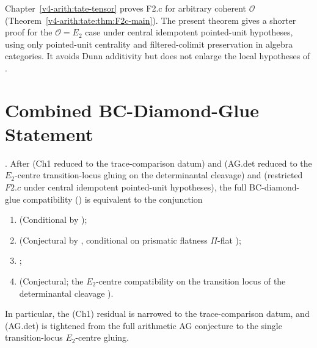 \begin{remark}
\label{v4-arith:w5-h:rem:f2c-value-add}
Chapter~\ref{v4-arith:tate-tensor} proves F2.c for
arbitrary coherent \(\mathcal{O}\) (Theorem~\ref{v4-arith:tate:thm:F2c-main}).
The present theorem gives a shorter proof for the
\(\mathcal{O}=E_{2}\) case under central idempotent pointed-unit
hypotheses, using only pointed-unit centrality and filtered-colimit
preservation in algebra categories. It avoids Dunn additivity but does
not enlarge the local hypotheses of
.
\end{remark}

\section{Combined BC-Diamond-Glue Statement}
\label{v4-arith:w5-h:combined}

\begin{theorem}
\label{v4-arith:w5-h:thm:combined-bcglue}
\ClaimStatusNeedsVerification. After
 (Ch1 reduced to the trace-comparison datum) and
 (AG.det reduced to the
\(E_{2}\)-centre transition-locus gluing on the determinantal cleavage)
and  (restricted \(F2.c\)
under central idempotent pointed-unit hypotheses), the full
BC-diamond-glue compatibility
() is equivalent to
the conjunction
\begin{enumerate}
\item[\textbf{(BCglue.local)}] (Conditional by
);
\item[\textbf{(BCglue.glue)}] (Conjectural by
, conditional on
prismatic flatness \(\Pi\)-flat
);
\item[\textbf{(Ch1.trace)}]
;
\item[\textbf{(AG.det.transition)}] (Conjectural; the
\(E_{2}\)-centre compatibility on the transition locus of the
determinantal cleavage
).
\end{enumerate}
In particular, the (Ch1) residual is narrowed to the trace-comparison
datum, and
(AG.det) is tightened from the full arithmetic AG conjecture to the
single transition-locus \(E_{2}\)-centre gluing.
\end{theorem}

